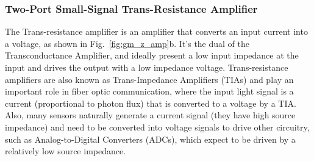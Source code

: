 \subsubsection{Two-Port Small-Signal Trans-Resistance Amplifier}
The Trans-resistance amplifier is an amplifier that converts an input current into a voltage, as shown in Fig.~\ref{fig:gm_z_amp}b.  It's the dual of the Transconductance Amplifier, and ideally present a low input impedance at the input and drives the output with a low impedance voltage.  Trans-resistance amplifiers are also known as Trans-Impedance Amplifiers (TIAs) and play an important role in fiber optic communication, where the input light signal is a current (proportional to photon flux) that is converted to a voltage by a TIA.  Also, many sensors naturally generate a current signal (they have high source impedance) and need to be converted into voltage signals to drive other circuitry, such as Analog-to-Digital Converters (ADCs), which expect to be driven by a relatively low source impedance.  
